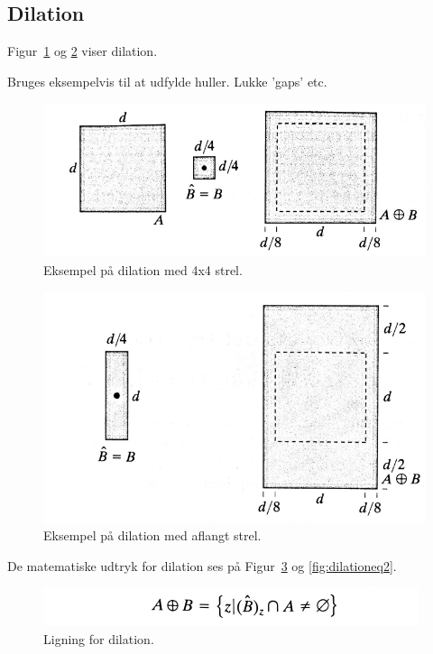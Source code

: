 \subsection{Dilation}
Figur~\ref{fig:dilation1} og \ref{fig:dilation2} viser dilation. 

Bruges eksempelvis til at udfylde huller. Lukke 'gaps' etc.

\begin{figure}[H]
	\centering
	\includegraphics[width=0.7\linewidth]{figs/spm09/dilation1}
	\caption{Eksempel på dilation med 4x4 strel.}
	\label{fig:dilation1}
\end{figure}

\begin{figure}[H]
	\centering
	\includegraphics[width=0.7\linewidth]{figs/spm09/dilation2}
	\caption{Eksempel på dilation med aflangt strel.}
	\label{fig:dilation2}
\end{figure}

De matematiske udtryk for dilation ses på Figur~\ref{fig:dilationeq1} og \ref{fig:dilationeq2}.

\begin{figure}[H]
	\centering
	\includegraphics[width=0.6\linewidth]{figs/spm09/dilationeq1}
	\caption{Ligning for dilation.}
	\label{fig:dilationeq1}
\end{figure}
